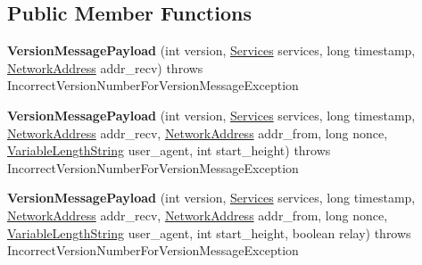\subsection*{Public Member Functions}
\begin{DoxyCompactItemize}
\item 
\hypertarget{classorg_1_1coinjuice_1_1message_1_1_version_message_payload_a5e75f5f8c60bd7be9c39e24f74e11b01}{{\bfseries Version\-Message\-Payload} (int version, \hyperlink{classorg_1_1coinjuice_1_1message_1_1field_1_1_services}{Services} services, long timestamp, \hyperlink{classorg_1_1coinjuice_1_1message_1_1field_1_1_network_address}{Network\-Address} addr\-\_\-recv)  throws Incorrect\-Version\-Number\-For\-Version\-Message\-Exception  }\label{classorg_1_1coinjuice_1_1message_1_1_version_message_payload_a5e75f5f8c60bd7be9c39e24f74e11b01}

\item 
\hypertarget{classorg_1_1coinjuice_1_1message_1_1_version_message_payload_a4c87ceb3a90931d49c4e66a83414ee34}{{\bfseries Version\-Message\-Payload} (int version, \hyperlink{classorg_1_1coinjuice_1_1message_1_1field_1_1_services}{Services} services, long timestamp, \hyperlink{classorg_1_1coinjuice_1_1message_1_1field_1_1_network_address}{Network\-Address} addr\-\_\-recv, \hyperlink{classorg_1_1coinjuice_1_1message_1_1field_1_1_network_address}{Network\-Address} addr\-\_\-from, long nonce, \hyperlink{classorg_1_1coinjuice_1_1message_1_1field_1_1_variable_length_string}{Variable\-Length\-String} user\-\_\-agent, int start\-\_\-height)  throws Incorrect\-Version\-Number\-For\-Version\-Message\-Exception }\label{classorg_1_1coinjuice_1_1message_1_1_version_message_payload_a4c87ceb3a90931d49c4e66a83414ee34}

\item 
\hypertarget{classorg_1_1coinjuice_1_1message_1_1_version_message_payload_a54ebe6a5e47cd2b92857078b2572561f}{{\bfseries Version\-Message\-Payload} (int version, \hyperlink{classorg_1_1coinjuice_1_1message_1_1field_1_1_services}{Services} services, long timestamp, \hyperlink{classorg_1_1coinjuice_1_1message_1_1field_1_1_network_address}{Network\-Address} addr\-\_\-recv, \hyperlink{classorg_1_1coinjuice_1_1message_1_1field_1_1_network_address}{Network\-Address} addr\-\_\-from, long nonce, \hyperlink{classorg_1_1coinjuice_1_1message_1_1field_1_1_variable_length_string}{Variable\-Length\-String} user\-\_\-agent, int start\-\_\-height, boolean relay)  throws Incorrect\-Version\-Number\-For\-Version\-Message\-Exception }\label{classorg_1_1coinjuice_1_1message_1_1_version_message_payload_a54ebe6a5e47cd2b92857078b2572561f}


\end{DoxyCompactItemize}
